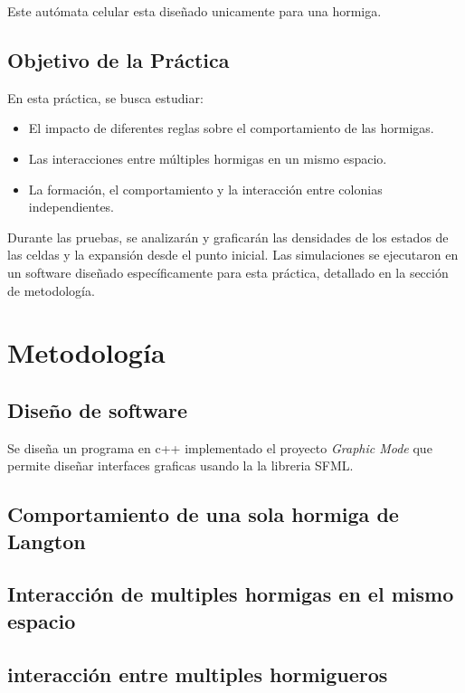\documentclass[12pt,twoside]{article}
\begin{document}
	Este autómata celular esta diseñado unicamente para una hormiga.
	
	\subsection{Objetivo de la Práctica}
	
	En esta práctica, se busca estudiar:  
	\begin{itemize}
		\item El impacto de diferentes reglas sobre el comportamiento de las hormigas.  
		\item Las interacciones entre múltiples hormigas en un mismo espacio.  
		\item La formación, el comportamiento y la interacción entre colonias independientes.  
	\end{itemize}
	
	Durante las pruebas, se analizarán y graficarán las densidades de los estados de las celdas y la expansión desde el punto inicial. Las simulaciones se ejecutaron en un software diseñado específicamente para esta práctica, detallado en la sección de metodología.
	
	\section{Metodología}
	
	\subsection{Diseño de software}
	
	Se diseña un programa en c++ implementado el proyecto \textit{Graphic Mode} que permite diseñar interfaces graficas usando la la libreria SFML.
	
	\subsection{Comportamiento de una sola hormiga de Langton}
	
	\subsection{Interacción de multiples hormigas en el mismo espacio}
	
	\subsection{interacción entre multiples hormigueros}
	

	\clearpage
	\begin{thebibliography}{99}
		\bibitem{}
		
	\end{thebibliography}
	
\end{document}
